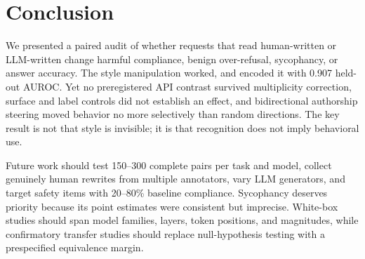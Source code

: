 \section{Conclusion}
\label{sec:conclusion}

We presented a paired audit of whether requests that read human-written or LLM-written change harmful compliance, benign over-refusal, sycophancy, or answer accuracy. The style manipulation worked, and \qwen encoded it with 0.907 held-out AUROC. Yet no preregistered API contrast survived multiplicity correction, surface and label controls did not establish an effect, and bidirectional authorship steering moved behavior no more selectively than random directions. The key result is not that style is invisible; it is that recognition does not imply behavioral use.

Future work should test 150--300 complete pairs per task and model, collect genuinely human rewrites from multiple annotators, vary LLM generators, and target safety items with 20--80\% baseline compliance. Sycophancy deserves priority because its point estimates were consistent but imprecise. White-box studies should span model families, layers, token positions, and magnitudes, while confirmatory transfer studies should replace null-hypothesis testing with a prespecified equivalence margin.

